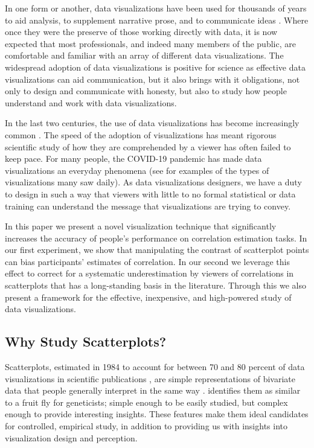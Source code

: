 \documentclass[preprint, 3p,
authoryear]{elsarticle} %
\begin{document}
In one form or another, data visualizations have been used for thousands
of years to aid analysis, to supplement narrative prose, and to
communicate ideas \citep{azzam_2013}. Where once they were the preserve
of those working directly with data, it is now expected that most
professionals, and indeed many members of the public, are comfortable
and familiar with an array of different data visualizations. The
widespread adoption of data visualizations is positive for science as
effective data visualizations can aid communication, but it also brings
with it obligations, not only to design and communicate with honesty,
but also to study how people understand and work with data
visualizations.

In the last two centuries, the use of data visualizations has become
increasingly common \citep{friendly_2005, azzam_2013}. The speed of the
adoption of visualizations has meant rigorous scientific study of how
they are comprehended by a viewer has often failed to keep pace. For
many people, the COVID-19 pandemic has made data visualizations an
everyday phenomena (see \citet{bbc_2022} for examples of the types of
visualizations many saw daily). As data visualizations designers, we
have a duty to design in such a way that viewers with little to no
formal statistical or data training can understand the message that
visualizations are trying to convey.

In this paper we present a novel visualization technique that
significantly increases the accuracy of people's performance on
correlation estimation tasks. In our first experiment, we show that
manipulating the contrast of scatterplot points can bias participants'
estimates of correlation. In our second we leverage this effect to
correct for a systematic underestimation by viewers of correlations in
scatterplots that has a long-standing basis in the literature. Through
this we also present a framework for the effective, inexpensive, and
high-powered study of data visualizations.

\hypertarget{why-study-scatterplots}{%
\subsection{Why Study Scatterplots?}\label{why-study-scatterplots}}

Scatterplots, estimated in 1984 to account for between 70 and 80 percent
of data visualizations in scientific publications \citep{tufte_1983},
are simple representations of bivariate data that people generally
interpret in the same way \citep{kay_heer_2015}. \citet{rensink_2014}
identifies them as similar to a fruit fly for geneticists; simple enough
to be easily studied, but complex enough to provide interesting
insights. These features make them ideal candidates for controlled,
empirical study, in addition to providing us with insights into
visualization design and perception.
\end{document}
